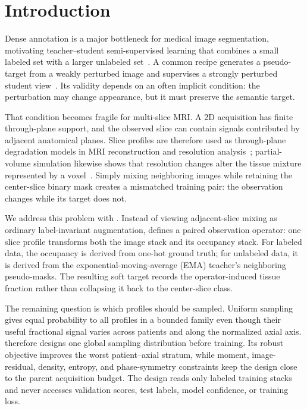 \section{Introduction}

Dense annotation is a major bottleneck for medical image segmentation, motivating teacher--student semi-supervised learning that combines a small labeled set with a larger unlabeled set~\cite{tarvainen2017mean,bai2023bcp}. A common recipe generates a pseudo-target from a weakly perturbed image and supervises a strongly perturbed student view~\cite{yang2023unimatch,zhao2023augseg}. Its validity depends on an often implicit condition: the perturbation may change appearance, but it must preserve the semantic target.

That condition becomes fragile for multi-slice MRI. A 2D acquisition has finite through-plane support, and the observed slice can contain signals contributed by adjacent anatomical planes. Slice profiles are therefore used as through-plane degradation models in MRI reconstruction and resolution analysis~\cite{han2021sliceprofile}; partial-volume simulation likewise shows that resolution changes alter the tissue mixture represented by a voxel~\cite{billot2020pvsynthseg}. Simply mixing neighboring images while retaining the center-slice binary mask creates a mismatched training pair: the observation changes while its target does not.

We address this problem with \method. Instead of viewing adjacent-slice mixing as ordinary label-invariant augmentation, \method defines a paired observation operator: one slice profile transforms both the image stack and its occupancy stack. For labeled data, the occupancy is derived from one-hot ground truth; for unlabeled data, it is derived from the exponential-moving-average (EMA) teacher's neighboring pseudo-masks. The resulting soft target records the operator-induced tissue fraction rather than collapsing it back to the center-slice class.

The remaining question is which profiles should be sampled. Uniform sampling gives equal probability to all profiles in a bounded family even though their useful fractional signal varies across patients and along the normalized axial axis. \method therefore designs one global sampling distribution before training. Its robust objective improves the worst patient--axial stratum, while moment, image-residual, density, entropy, and phase-symmetry constraints keep the design close to the parent acquisition budget. The design reads only labeled training stacks and never accesses validation scores, test labels, model confidence, or training loss.

